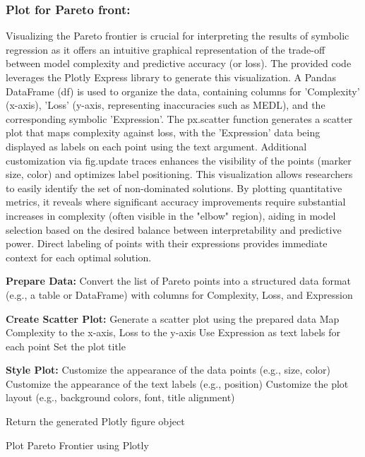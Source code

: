 \documentclass{article}
\begin{document}
\subsubsection{Plot for Pareto front:}



Visualizing the Pareto frontier is crucial for interpreting the results of symbolic regression as it offers an intuitive graphical representation of the trade-off between model complexity and predictive accuracy (or loss). The provided code leverages the Plotly Express library to generate this visualization. A Pandas DataFrame (df) is used to organize the data, containing columns for 'Complexity' (x-axis), 'Loss' (y-axis, representing inaccuracies such as MEDL), and the corresponding symbolic 'Expression'. The px.scatter function generates a scatter plot that maps complexity against loss, with the 'Expression' data being displayed as labels on each point using the text argument. Additional customization via fig.update traces enhances the visibility of the points (marker size, color) and optimizes label positioning. This visualization allows researchers to easily identify the set of non-dominated solutions. By plotting quantitative metrics, it reveals where significant accuracy improvements require substantial increases in complexity (often visible in the "elbow" region), aiding in model selection based on the desired balance between interpretability and predictive power. Direct labeling of points with their expressions provides immediate context for each optimal solution.\\



\begin{algorithm}[H]
\SetAlgoLined %

\textbf{Prepare Data:}\;
Convert the list of Pareto points into a structured data format (e.g., a table or DataFrame) with columns for Complexity, Loss, and Expression\;

\textbf{Create Scatter Plot:}\;
Generate a scatter plot using the prepared data\;
Map Complexity to the x-axis, Loss to the y-axis\;
Use Expression as text labels for each point\;
Set the plot title\;

\textbf{Style Plot:}\;
Customize the appearance of the data points (e.g., size, color)\;
Customize the appearance of the text labels (e.g., position)\;
Customize the plot layout (e.g., background colors, font, title alignment)\;

Return the generated Plotly figure object\;

\caption{Plot Pareto Frontier using Plotly}
\label{alg:plot_pareto_frontier} %
\end{algorithm}
\end{document}
